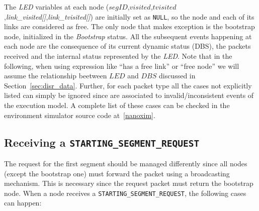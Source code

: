 The \emph{LED} variables at each node
($segID$,$visited$,$tvisited$,\emph{link\_visited[]},\emph{link\_tvisited[]})
are initially set as \texttt{NULL}, so the node and each of its links
are considered as free.
The only node that makes exception is the bootstrap node, initialized
in the \emph{Bootstrap} status. All the subsequent events happening at
each node are the consequence of its current dynamic status (DBS), the
packets received and the internal status represented by the
\emph{LED}. Note that in the following, when using expression like
``has a free link'' or ``free node'' we will assume the relationship beetween 
$LED$ and $DBS$ discussed in Section~\ref{sec:disr_data}. Further, for
each packet type all the cases not explicitly listed can simply be
ignored since are associated to invalid/inconsistent events of the
\disr{} execution model. A complete list of these cases can be checked
in the environment simulator source code at~\ref{nanoxim}.

\subsection{Receiving a \texttt{STARTING\_SEGMENT\_REQUEST}}

The request for the first segment should be managed differently since
all nodes (except the bootstrap one) must forward the packet using a
broadcasting mechanism. This is necessary since the request packet must
return the bootstrap node.
When a node receives a \texttt{STARTING\_SEGMENT\_REQUEST}, the
following cases can happen:

